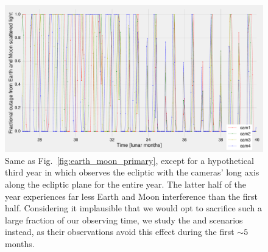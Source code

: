 \begin{figure}[!t]
	\centering
	\includegraphics[angle=90,width=1.05\textwidth]{figures/outage_earth_moon_ecl_narrow_1yr.pdf}
	\caption{Same as Fig.~\protect\ref{fig:earth_moon_primary}, except for a hypothetical third year in which \tess observes the ecliptic with the cameras' long axis along the ecliptic plane for the entire year. The latter half of the year experiences far less Earth and Moon interference than the first half. Considering it implausible that we would opt to sacrifice such a large fraction of our observing time, we study the \elong\:and \eshort\:scenarios instead, as their observations avoid this effect during the first $\sim5$ months.}
	\label{fig:earth_moon_elong}
\end{figure}
